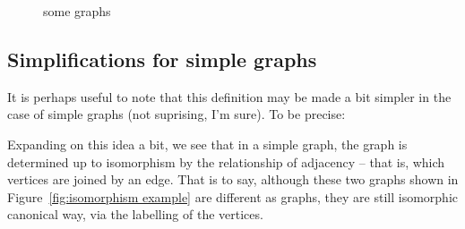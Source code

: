 \documentclass[12pt]{report}
\theoremstyle{plain}
\begin{document}
\begin{figure} \label{fig:graph examples}
\begin{center}
\caption{some graphs}

\hspace{1cm}
\hspace{1cm}
\end{center}
\end{figure}

\subsection{Simplifications for simple graphs}
It is perhaps useful to note that this definition may be made a bit simpler
in the case of simple graphs (not suprising, I'm sure). To be precise:

Expanding on this idea a bit, we see that in a simple graph, the graph is
determined up to isomorphism by the relationship of adjacency -- that is,
which vertices are joined by an edge. That is to say, although these two
graphs shown in Figure~\ref{fig:isomorphism example} are different as
graphs, they are still isomorphic canonical way, via the labelling of the
vertices. 
\end{document}
